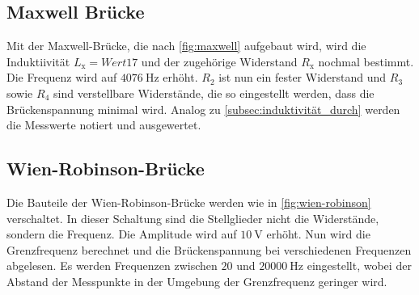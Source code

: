 \subsection{Maxwell Brücke}
\label{subsec:maxwell_durch}
Mit der Maxwell-Brücke, die nach \autoref{fig:maxwell} aufgebaut wird, wird die Induktiivität $L_{\text{x}}=Wert 17$ und der zugehörige Widerstand $R_{\text{x}}$ nochmal bestimmt.
Die Frequenz wird auf $\qty{4076}{\hertz}$ erhöht. 
$R_2$ ist nun ein fester Widerstand und $R_3$ sowie $R_4$ sind verstellbare Widerstände, die so eingestellt werden, dass die Brückenspannung minimal wird.
Analog zu \autoref{subsec:induktivität_durch} werden die Messwerte notiert und ausgewertet.

\subsection{Wien-Robinson-Brücke}
\label{subsec:wien-robinson_durch}
Die Bauteile der Wien-Robinson-Brücke werden wie in \autoref{fig:wien-robinson} verschaltet.
In dieser Schaltung sind die Stellglieder nicht die Widerstände, sondern die Frequenz.
Die Amplitude wird auf $\qty{10}{\volt}$ erhöht.
Nun wird die Grenzfrequenz berechnet und die Brückenspannung bei verschiedenen Frequenzen abgelesen.
Es werden Frequenzen zwischen $20$ und $\qty{20000}{\hertz}$ eingestellt, wobei der Abstand der Messpunkte in der Umgebung der Grenzfrequenz geringer wird.